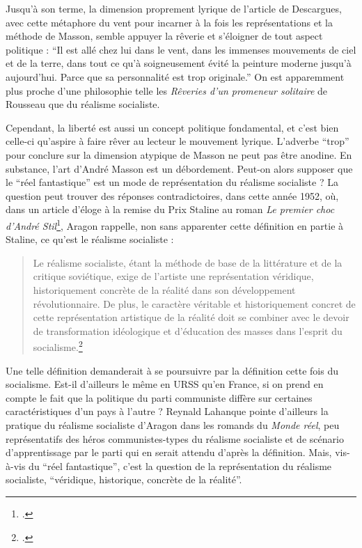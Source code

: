 Jusqu’à son terme, la dimension proprement lyrique de l’article de Descargues, avec cette métaphore du vent pour incarner à la fois les représentations et la méthode de Masson, semble appuyer la rêverie et s’éloigner de tout aspect politique : \enquote{Il est allé chez lui dans le vent, dans les immenses mouvements de ciel et de la terre, dans tout ce qu’à soigneusement évité la peinture moderne jusqu’à aujourd’hui. Parce que sa personnalité est trop originale.} On est apparemment plus proche d’une philosophie telle les \emph{Rêveries d’un promeneur solitaire} de Rousseau que du réalisme socialiste. 

	Cependant, la liberté est aussi un concept politique fondamental, et c’est bien celle-ci qu’aspire à faire rêver au lecteur le mouvement lyrique. L’adverbe \enquote{trop} pour conclure sur la dimension atypique de Masson ne peut pas être anodine. En substance, l’art d’André Masson est un débordement. Peut-on alors supposer que le \enquote{réel fantastique} est un mode de représentation du réalisme socialiste ? La question peut trouver des réponses contradictoires, dans cette année 1952, où, dans un article d’éloge à la remise du Prix Staline au roman \emph{Le premier choc d’André Stil}\footcite{prixstaline}, Aragon rappelle, non sans apparenter cette définition en partie à Staline, ce qu’est le réalisme socialiste : 
	\begin{quote}
	Le réalisme socialiste, étant la méthode de base de la littérature et de la critique soviétique, exige de l’artiste une représentation véridique, historiquement concrète de la réalité dans son développement révolutionnaire. De plus, le caractère véritable et historiquement concret de cette représentation artistique de la réalité doit se combiner avec le devoir de transformation idéologique et d’éducation des masses dans l’esprit du socialisme.\footcite{prixstaline}\end{quote}
	
	 Une telle définition demanderait à se poursuivre par la définition cette fois du socialisme. Est-il d’ailleurs le même en URSS qu’en France, si on prend en compte le fait que la politique du parti communiste diffère sur certaines caractéristiques d’un pays à l’autre ? Reynald Lahanque pointe d’ailleurs la pratique du réalisme socialiste d’Aragon dans les romands du \emph{Monde réel}, peu représentatifs des héros communistes-types du réalisme socialiste et de scénario d’apprentissage par le parti qui en serait attendu d’après la définition. Mais, vis-à-vis du \enquote{réel fantastique}, c’est la question de la représentation du réalisme socialiste, \enquote{véridique, historique, concrète de la réalité}.

